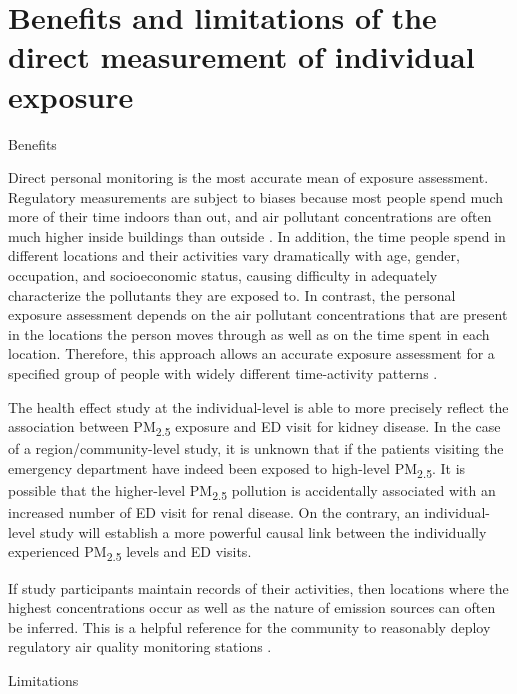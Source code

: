 \documentclass[11pt]{article}
\newcommand{\tsub}{\textsubscript}
\begin{document}
\section{Benefits and limitations of the direct measurement of individual exposure}
\begin{itemize*}
    \item Benefits {
        \begin{enumerate*}[{[1)]}]
            \item Direct personal monitoring is the most accurate mean of exposure assessment. Regulatory measurements are subject to biases because most people spend much more of their time indoors than out, and air pollutant concentrations are often much higher inside buildings than outside \citep{spengler1983indoor}. In addition, the time people spend in different locations and their activities vary dramatically with age, gender, occupation, and socioeconomic status, causing difficulty in adequately characterize the pollutants they are exposed to. In contrast, the personal exposure assessment depends on the air pollutant concentrations that are present in the locations the person moves through as well as on the time spent in each location. Therefore, this approach allows an accurate exposure assessment for a specified group of people with widely different time-activity patterns \citep{watson1988air}. 
            \item The health effect study at the individual-level is able to more precisely reflect the association between PM\tsub{2.5} exposure and ED visit for kidney disease. In the case of a region/community-level study, it is unknown that if the patients visiting the emergency department have indeed been exposed to high-level PM\tsub{2.5}. It is possible that the higher-level PM\tsub{2.5} pollution is accidentally associated with an increased number of ED visit for renal disease. On the contrary, an individual-level study will establish a more powerful causal link between the individually experienced PM\tsub{2.5} levels and ED visits.
            \item If study participants maintain records of their activities, then locations where the highest concentrations occur as well as the nature of emission sources can often be inferred. This is a helpful reference for the community to reasonably deploy regulatory air quality monitoring stations \citep{watson1988air}.  
        \end{enumerate*}
    }
    \item Limitations {
        \begin{enumerate*}[{[1)]}]

\end{enumerate*}}
\end{itemize*}
\end{document}
